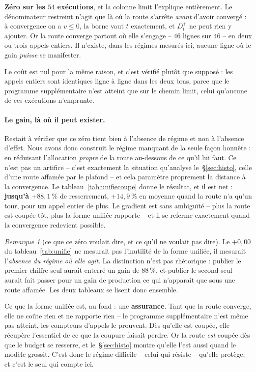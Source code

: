 \documentclass[11pt,a4paper]{article}
\theoremstyle{plain}
\theoremstyle{remark}
\newtheorem{remark}{Remarque}
\begin{document}
\noindent
\textbf{Zéro sur les $54$ exécutions}, et la colonne \textsf{limit}
l'explique entièrement. Le dénominateur restreint n'agit que là où la route
s'arrête \emph{avant} d'avoir convergé : à convergence on a $v\le 0$, la
borne vaut $t$ exactement, et $D^{+}_{t}$ ne peut rien y ajouter. Or la
route converge partout où elle s'engage -- $46$ lignes sur $46$ -- en deux
ou trois appels entiers. Il n'existe, dans les régimes mesurés ici, aucune
ligne où le gain \emph{puisse} se manifester.

Le coût est nul pour la même raison, et c'est vérifié plutôt que supposé :
les appels entiers sont identiques ligne à ligne dans les deux bras, parce
que le programme supplémentaire n'est atteint que sur le chemin
\textsf{limit}, celui qu'aucune de ces exécutions n'emprunte.

\paragraph{Le gain, là où il peut exister.} Restait à vérifier que ce zéro
tient bien à l'absence de régime et non à l'absence d'effet. Nous avons donc
construit le régime manquant de la seule façon honnête : en réduisant
l'allocation \emph{propre} de la route au-dessous de ce qu'il lui faut.
Ce n'est pas un artifice -- c'est exactement la situation qu'analyse
le~\S\ref{sec:histo}, celle d'une route affamée par le plafond -- et cela
paramètre proprement la distance à la convergence. Le
tableau~\ref{tab:unifiecoupe} donne le résultat, et il est net :
\textbf{jusqu'à $+88{,}1\ \%$} de resserrement, $+14{,}9\ \%$ en moyenne
quand la route n'a qu'un tour, pour \textbf{un} appel entier de plus. Le gradient
est sans ambiguïté -- plus la route est coupée tôt, plus la forme unifiée
rapporte -- et il se referme exactement quand la convergence redevient
possible.

\begin{remark}[ce que ce zéro voulait dire, et ce qu'il ne voulait pas dire]
Le $+0{,}00$ du tableau~\ref{tab:unifie} ne mesurait pas l'inutilité de la
forme unifiée, il mesurait l'\emph{absence du régime où elle agit}. La
distinction n'est pas rhétorique : publier le premier chiffre seul aurait
enterré un gain de $88\ \%$, et publier le second seul aurait fait passer
pour un gain de production ce qui n'apparaît que sous une route affamée.
Les deux tableaux se lisent donc ensemble.

Ce que la forme unifiée est, au fond : une \textbf{assurance}. Tant que la
route converge, elle ne coûte rien et ne rapporte rien -- le programme
supplémentaire n'est même pas atteint, les compteurs d'appels le prouvent.
Dès qu'elle est coupée, elle récupère l'essentiel de ce que la coupure
faisait perdre. Or la route \emph{est} coupée dès que le budget se resserre,
et le~\S\ref{sec:histo} montre qu'elle l'est aussi quand le modèle grossit.
C'est donc le régime difficile -- celui qui résiste -- qu'elle protège, et
c'est le seul qui compte ici.
\end{remark}
\end{document}
